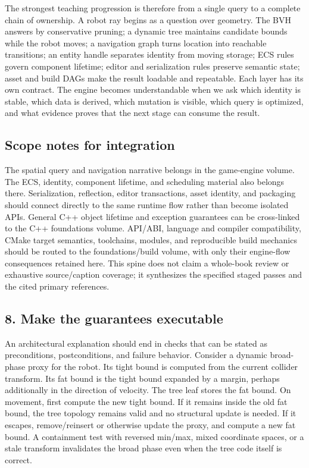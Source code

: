 The strongest teaching progression is therefore from a single query to a complete chain of ownership. A robot ray begins as a question over geometry. The BVH answers by conservative pruning; a dynamic tree maintains candidate bounds while the robot moves; a navigation graph turns location into reachable transitions; an entity handle separates identity from moving storage; ECS rules govern component lifetime; editor and serialization rules preserve semantic state; asset and build DAGs make the result loadable and repeatable. Each layer has its own contract. The engine becomes understandable when we ask which identity is stable, which data is derived, which mutation is visible, which query is optimized, and what evidence proves that the next stage can consume the result.

\subsection{Scope notes for integration}\label{05-engine-i-ch008-scope-notes-for-integration}

The spatial query and navigation narrative belongs in the game-engine volume. The ECS, identity, component lifetime, and scheduling material also belongs there. Serialization, reflection, editor transactions, asset identity, and packaging should connect directly to the same runtime flow rather than become isolated APIs. General C++ object lifetime and exception guarantees can be cross-linked to the C++ foundations volume. API/ABI, language and compiler compatibility, CMake target semantics, toolchains, modules, and reproducible build mechanics should be routed to the foundations/build volume, with only their engine-flow consequences retained here. This spine does not claim a whole-book review or exhaustive source/caption coverage; it synthesizes the specified staged passes and the cited primary references.

\subsection{8. Make the guarantees executable}\label{05-engine-i-ch008-make-the-guarantees-executable}

An architectural explanation should end in checks that can be stated as preconditions, postconditions, and failure behavior. Consider a dynamic broad-phase proxy for the robot. Its tight bound is computed from the current collider transform. Its fat bound is the tight bound expanded by a margin, perhaps additionally in the direction of velocity. The tree leaf stores the fat bound. On movement, first compute the new tight bound. If it remains inside the old fat bound, the tree topology remains valid and no structural update is needed. If it escapes, remove/reinsert or otherwise update the proxy, and compute a new fat bound. A containment test with reversed min/max, mixed coordinate spaces, or a stale transform invalidates the broad phase even when the tree code itself is correct.

